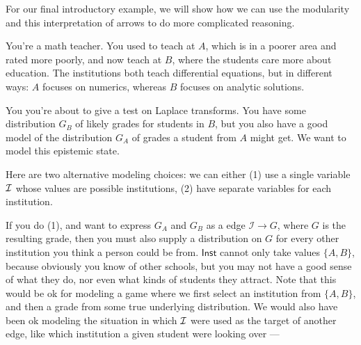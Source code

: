 \documentclass{article}
\newcommand{\Ed}{\mathcal E}
\numberwithin{equation}{section}
\begin{document}
\begin{notfocus}
	
	\begin{vfull}
	For our final introductory example, we will show how we can use the modularity and this interpretation of arrows to do more complicated reasoning.

	\begin{example} \label{ex:teacher}
		You're a math teacher. You used to teach at $A$, which is in a poorer area and rated more poorly, and now teach at $B$, where the students care more about education. The institutions both teach differential equations, but in different ways: $A$ focuses on numerics, whereas $B$ focuses on analytic solutions.
		
		You you're about to give a test on Laplace transforms.
		You have some distribution $G_B$ of likely grades for students in $B$, but you also have a good model of the distribution $G_A$ of grades a student from $A$ might get. We want to model this epistemic state.

		Here are two alternative modeling choices: we can either (1) use a single variable $\cal I$ whose values are possible institutions, (2) have separate variables for each institution.
		
		\begin{center}
		\end{center}
		
		If you do (1), and want to express $G_A$ and $G_B$ as a edge $\mathcal  I \to G$, where $G$ is the resulting grade, then you must also supply a distribution on $G$ for every other institution you think a person could be from. $\mathsf {Inst}$ cannot only take values $\{A,B\} $, because obviously you know of other schools, but you may not have a good sense of what they do, nor even what kinds of students they attract. 
			Note that this would be ok for modeling a game where we first select an institution from $\{A, B\}$, and then a grade from some true underlying distribution. We would also have been ok modeling the situation in which $\cal I$ were used as the target of another edge, like which institution a given student were looking over --- 
		

\end{example}
\end{vfull}
\end{notfocus}
\end{document}
